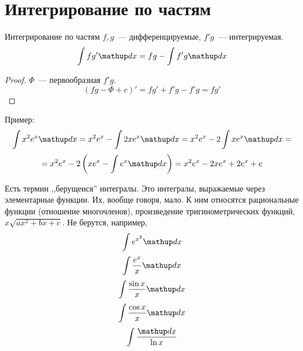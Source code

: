 ﻿\section{Интегрирование по частям}

\begin{theorem}{Интегрирование по частям}
$f, g$~--- дифференцируемые, $f'g$~--- интегрируемая.
$$\int fg'\d x = fg - \int f'g \d x$$
\end{theorem}
\begin{proof}
$\Phi$~--- первообразная $f'g$.
$$(fg - \Phi + c)' = fg' + f'g - f'g = fg'$$
\end{proof}

Пример:
$$\int x^2 e^x \d x = x^2 e^x - \int 2x e^x \d x = x^2 e^x - 2 \int x e^x \d x = $$
$$ = x^2 e^x - 2\left(x e^x - \int e^x \d x\right) = x^2 e^x - 2x e^x + 2e^x + c$$

Есть термин ,,берущеися'' интегралы. Это интегралы, выражаемые через элементарные функции. Их, вообще говоря, мало. К ним относятся рациональные функции (отношение многочленов), произведение тригинометрических функций, $x\sqrt{ax^2 + bx + c}$. Не берутся, например, 
$$\int e^{x^2} \d x$$
$$\int \frac{e^x}x \d x$$
$$\int \frac{\sin x}x \d x$$
$$\int \frac{\cos x}x\d x$$
$$\int \frac{\d x}{\ln x}$$